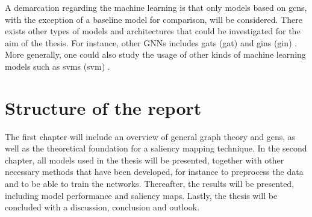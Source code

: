 A demarcation regarding the machine learning is that only models based on \acrshort{gcn}s, with the exception of a baseline model for comparison, will be considered. There exists other types of models and architectures that could be investigated for the aim of the thesis. For instance, other GNNs includes \acrlong{gat}s (\acrshort{gat}) \cite{gat} and \acrlong{gin}s (\acrshort{gin}) \cite{gin}. More generally, one could also  study the usage of other kinds of machine learning models such as \acrlong{svm}s (\acrshort{svm}) \cite{neuro_ml}.


\section{Structure of the report}
The first chapter will include an overview of general graph theory and \acrlong{gcn}s, as well as the theoretical foundation for a saliency mapping technique. In the second chapter, all models used in the thesis will be presented, together with other necessary methods that have been developed, for instance to preprocess the data and to be able to train the networks. Thereafter, the results will be presented, including model performance and saliency maps. Lastly, the thesis will be concluded with a discussion, conclusion and outlook. 